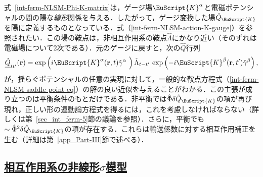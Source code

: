 \documentclass[a4paper,11pt]{ltjsarticle}
\newcommand{\subsectionlink}[1]{\subsection[#1]{\hyperlink{toc}{#1}}}
\def\rt{(\mathbf{r},t)}
\def\rtp{(\mathbf{r},t')}
\def\Qk{\hat{Q}_{\EuScript{K}}}
\begin{document}
式~\eqref{int-ferm-NLSM-Phi-K-matrix}は，ゲージ場$\EuScript{K}^\alpha$と電磁ポテンシャルの間の陽な{\em 線形}関係を与える．したがって，ゲージ変換した場$\Qk$を陽に定義するものとなっている．式（\ref{int-ferm-NLSM-action-K-gauge}）を参照されたい．この場の鞍点は，非相互作用系の鞍点$\hat \Lambda$にかなり近い（そのずれは電磁場について2次である）．元のゲージに戻すと，次の$\hat Q$行列
\begin{equation}\label{int-ferm-NLSM-Q-gauge-general}
\underline{\hat{Q}}_{tt'}(\mathbf{r})=
\exp\left(i\EuScript{K}^{\alpha}\rt\hat{\gamma}^{\alpha}\phantom{^{'}}\right)
\hat{\Lambda}_{t-t'}\,
\exp\left(-i\EuScript{K}^{\beta}\rtp\hat{\gamma}^{\beta}\right),
\end{equation}
が，揺らぐポテンシャルの任意の実現に対して，一般的な鞍点方程式（\ref{int-ferm-NLSM-saddle-point-eq}）の解の良い近似を与えることがわかる．この主張が成り立つのは平衡条件のもとだけである．非平衡では$\hat{\Phi}\delta\Qk$の項が再び現れ，正しい形の運動論方程式を得るには，これを考慮しなければならない（詳しくは第~\ref{sec_int_ferm-5}節の議論を参照）．さらに，平衡でも$\sim\hat{\Phi}^{2}\delta\Qk$の項が存在する．これらは輸送係数に対する相互作用補正を生む（詳細は第~\ref{app_Part-III}節で述べる）．


\subsectionlink{相互作用系の非線形$\sigma$模型}\label{sec_int_ferm-3}
\end{document}
